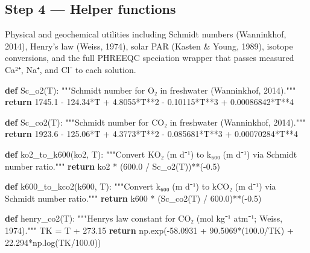 \documentclass[
  letterpaper,
  DIV=11,
  numbers=noendperiod]{scrartcl}
\newenvironment{Shaded}{\begin{snugshade}}{\end{snugshade}}
\newcommand{\CommentTok}[1]{\textcolor[rgb]{0.37,0.37,0.37}{#1}}
\newcommand{\ControlFlowTok}[1]{\textcolor[rgb]{0.00,0.23,0.31}{\textbf{#1}}}
\newcommand{\DecValTok}[1]{\textcolor[rgb]{0.68,0.00,0.00}{#1}}
\newcommand{\FloatTok}[1]{\textcolor[rgb]{0.68,0.00,0.00}{#1}}
\newcommand{\KeywordTok}[1]{\textcolor[rgb]{0.00,0.23,0.31}{\textbf{#1}}}
\newcommand{\NormalTok}[1]{\textcolor[rgb]{0.00,0.23,0.31}{#1}}
\newcommand{\OperatorTok}[1]{\textcolor[rgb]{0.37,0.37,0.37}{#1}}
\begin{document}
\subsection{Step 4 --- Helper functions}\label{step-4-helper-functions}

Physical and geochemical utilities including Schmidt numbers
(Wanninkhof, 2014), Henry's law (Weiss, 1974), solar PAR (Kasten \&
Young, 1989), isotope conversions, and the full PHREEQC speciation
wrapper that passes measured Ca²⁺, Na⁺, and Cl⁻ to each solution.

\begin{Shaded}
\begin{Highlighting}[]
\KeywordTok{def}\NormalTok{ Sc\_o2(T):}
    \CommentTok{"""Schmidt number for O₂ in freshwater (Wanninkhof, 2014)."""}
    \ControlFlowTok{return} \FloatTok{1745.1} \OperatorTok{{-}} \FloatTok{124.34}\OperatorTok{*}\NormalTok{T }\OperatorTok{+} \FloatTok{4.8055}\OperatorTok{*}\NormalTok{T}\OperatorTok{**}\DecValTok{2} \OperatorTok{{-}} \FloatTok{0.10115}\OperatorTok{*}\NormalTok{T}\OperatorTok{**}\DecValTok{3} \OperatorTok{+} \FloatTok{0.00086842}\OperatorTok{*}\NormalTok{T}\OperatorTok{**}\DecValTok{4}

\KeywordTok{def}\NormalTok{ Sc\_co2(T):}
    \CommentTok{"""Schmidt number for CO₂ in freshwater (Wanninkhof, 2014)."""}
    \ControlFlowTok{return} \FloatTok{1923.6} \OperatorTok{{-}} \FloatTok{125.06}\OperatorTok{*}\NormalTok{T }\OperatorTok{+} \FloatTok{4.3773}\OperatorTok{*}\NormalTok{T}\OperatorTok{**}\DecValTok{2} \OperatorTok{{-}} \FloatTok{0.085681}\OperatorTok{*}\NormalTok{T}\OperatorTok{**}\DecValTok{3} \OperatorTok{+} \FloatTok{0.00070284}\OperatorTok{*}\NormalTok{T}\OperatorTok{**}\DecValTok{4}

\KeywordTok{def}\NormalTok{ ko2\_to\_k600(ko2, T):}
    \CommentTok{"""Convert KO₂ (m d⁻¹) to k₆₀₀ (m d⁻¹) via Schmidt number ratio."""}
    \ControlFlowTok{return}\NormalTok{ ko2 }\OperatorTok{*}\NormalTok{ (}\FloatTok{600.0} \OperatorTok{/}\NormalTok{ Sc\_o2(T))}\OperatorTok{**}\NormalTok{(}\OperatorTok{{-}}\FloatTok{0.5}\NormalTok{)}

\KeywordTok{def}\NormalTok{ k600\_to\_kco2(k600, T):}
    \CommentTok{"""Convert k₆₀₀ (m d⁻¹) to kCO₂ (m d⁻¹) via Schmidt number ratio."""}
    \ControlFlowTok{return}\NormalTok{ k600 }\OperatorTok{*}\NormalTok{ (Sc\_co2(T) }\OperatorTok{/} \FloatTok{600.0}\NormalTok{)}\OperatorTok{**}\NormalTok{(}\OperatorTok{{-}}\FloatTok{0.5}\NormalTok{)}

\KeywordTok{def}\NormalTok{ henry\_co2(T):}
    \CommentTok{"""Henry\textquotesingle{}s law constant for CO₂ (mol kg⁻¹ atm⁻¹; Weiss, 1974)."""}
\NormalTok{    TK }\OperatorTok{=}\NormalTok{ T }\OperatorTok{+} \FloatTok{273.15}
    \ControlFlowTok{return}\NormalTok{ np.exp(}\OperatorTok{{-}}\FloatTok{58.0931} \OperatorTok{+} \FloatTok{90.5069}\OperatorTok{*}\NormalTok{(}\FloatTok{100.0}\OperatorTok{/}\NormalTok{TK) }\OperatorTok{+} \FloatTok{22.294}\OperatorTok{*}\NormalTok{np.log(TK}\OperatorTok{/}\FloatTok{100.0}\NormalTok{))}


\end{Highlighting}
\end{Shaded}
\end{document}
